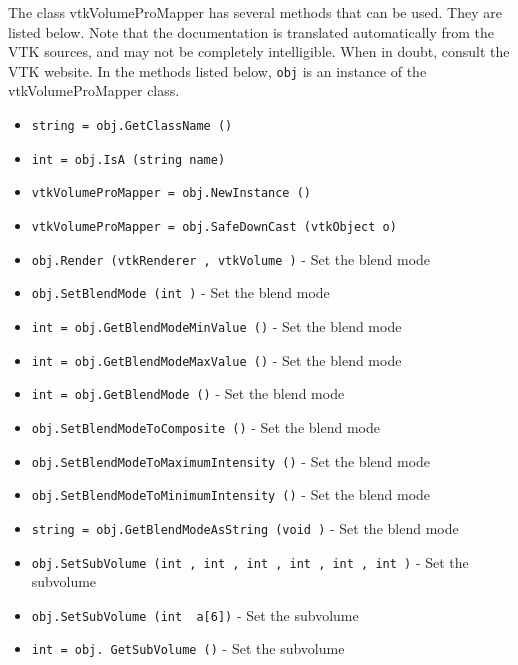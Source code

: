 The class vtkVolumeProMapper has several methods that can be used.
  They are listed below.
Note that the documentation is translated automatically from the VTK sources,
and may not be completely intelligible.  When in doubt, consult the VTK website.
In the methods listed below, \verb|obj| is an instance of the vtkVolumeProMapper class.
\begin{itemize}
\item  \verb|string = obj.GetClassName ()|

\item  \verb|int = obj.IsA (string name)|

\item  \verb|vtkVolumeProMapper = obj.NewInstance ()|

\item  \verb|vtkVolumeProMapper = obj.SafeDownCast (vtkObject o)|

\item  \verb|obj.Render (vtkRenderer , vtkVolume )| -  Set the blend mode

\item  \verb|obj.SetBlendMode (int )| -  Set the blend mode

\item  \verb|int = obj.GetBlendModeMinValue ()| -  Set the blend mode

\item  \verb|int = obj.GetBlendModeMaxValue ()| -  Set the blend mode

\item  \verb|int = obj.GetBlendMode ()| -  Set the blend mode

\item  \verb|obj.SetBlendModeToComposite ()| -  Set the blend mode

\item  \verb|obj.SetBlendModeToMaximumIntensity ()| -  Set the blend mode

\item  \verb|obj.SetBlendModeToMinimumIntensity ()| -  Set the blend mode

\item  \verb|string = obj.GetBlendModeAsString (void )| -  Set the blend mode

\item  \verb|obj.SetSubVolume (int , int , int , int , int , int )| -  Set the subvolume

\item  \verb|obj.SetSubVolume (int  a[6])| -  Set the subvolume

\item  \verb|int = obj. GetSubVolume ()| -  Set the subvolume


\end{itemize}
